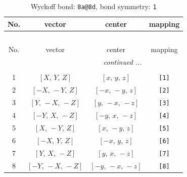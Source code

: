 \documentclass[fleqn,8pt]{jsarticle}
\begin{document}
\begin{longtable}{cccc}
\caption{Wyckoff bond: {\tt 8a@8d}, bond symmetry: {\tt 1}}
 \\
 \hline \hline
No. & vector & center & mapping \\ \hline \endfirsthead

\multicolumn{3}{l}{\tablename\ \thetable{}} \\
 \hline \hline
No. & vector & center & mapping \\ \hline \endhead

 \hline \hline
\multicolumn{3}{r}{\footnotesize\it continued ...} \\ \endfoot

 \hline \hline
\multicolumn{3}{r}{} \\ \endlastfoot

1 & $\left[ X,\, Y,\, Z \right]$ & $\left[ x,\, y,\, z \right]$ & {\tt [1]} \\ \hline
2 & $\left[ - X,\, - Y,\, Z \right]$ & $\left[ - x,\, - y,\, z \right]$ & {\tt [2]} \\ \hline
3 & $\left[ Y,\, - X,\, - Z \right]$ & $\left[ y,\, - x,\, - z \right]$ & {\tt [3]} \\ \hline
4 & $\left[ - Y,\, X,\, - Z \right]$ & $\left[ - y,\, x,\, - z \right]$ & {\tt [4]} \\ \hline
5 & $\left[ X,\, - Y,\, Z \right]$ & $\left[ x,\, - y,\, z \right]$ & {\tt [5]} \\ \hline
6 & $\left[ - X,\, Y,\, Z \right]$ & $\left[ - x,\, y,\, z \right]$ & {\tt [6]} \\ \hline
7 & $\left[ Y,\, X,\, - Z \right]$ & $\left[ y,\, x,\, - z \right]$ & {\tt [7]} \\ \hline
8 & $\left[ - Y,\, - X,\, - Z \right]$ & $\left[ - y,\, - x,\, - z \right]$ & {\tt [8]} \\
\end{longtable}
\end{document}
